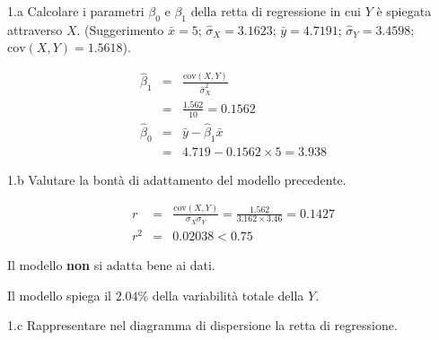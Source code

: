 \documentclass[
  11pt,
]{book}
\theoremstyle{mytheoremstyle}
\theoremstyle{mydefstyle}
\newenvironment{sol}
  {
  \begin{tcolorbox}[enhanced,breakable,arc=0.1mm,boxrule=1pt,colback=white,colframe=iblue,
  title=\bf \fontfamily{lmss}\selectfont \hspace{.5 cm} Soluzione,drop fuzzy shadow]

}{
\end{tcolorbox}
  }
\begin{document}
1.a Calcolare i parametri \(\beta_{0}\) e \(\beta_{1}\)
della retta di regressione in cui \(Y\) è spiegata attraverso \(X\).
(Suggerimento \(\bar{x} = 5\); \(\hat\sigma_{X} = 3.1623\);
\(\bar{y} = 4.7191\); \(\hat\sigma_{Y} = 3.4598\); \(\text{cov}(X,Y)= 1.5618\)).

\begin{sol}
\begin{eqnarray*}
       \hat\beta_1 &=& \frac{\text{cov}(X,Y)}{\hat\sigma_X^2} \\
            &=& \frac{ 1.562 }{ 10 }  =  0.1562 \\
      \hat\beta_0 &=& \bar y - \hat\beta_1 \bar x\\
          &=&  4.719 - 0.1562 \times  5 = 3.938 
      \end{eqnarray*}

\end{sol}

1.b Valutare la bontà di adattamento del modello precedente.

\begin{sol}
\begin{eqnarray*}
r&=&\frac{\text{cov}(X,Y)}{\sigma_X\sigma_Y}=\frac{ 1.562 }{ 3.162 \times 3.46 }= 0.1427 \\ 
r^2&=& 0.02038 < 0.75
\end{eqnarray*}

Il modello \textbf{non} si adatta bene ai dati.

Il modello spiega il \(2.04\%\) della variabilità totale della \(Y\).

\end{sol}

1.c Rappresentare nel diagramma di dispersione la retta di regressione.
\end{document}
